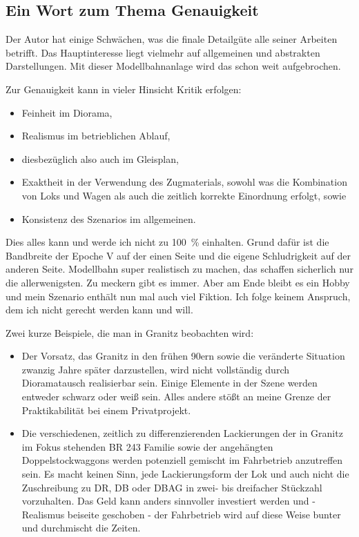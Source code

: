 \subsection{Ein Wort zum Thema Genauigkeit}
\label{sec:modelingAccuracy}

Der Autor hat einige Schw\"achen, was die finale Detailg\"ute alle seiner Arbeiten betrifft.
Das Hauptinteresse liegt vielmehr auf allgemeinen und abstrakten Darstellungen.
Mit dieser Modellbahnanlage wird das schon weit aufgebrochen.

Zur Genauigkeit kann in vieler Hinsicht Kritik erfolgen:
\begin{itemize}
	\item Feinheit im Diorama,
	\item Realismus im betrieblichen Ablauf,
	\item diesbez\"uglich also auch im Gleisplan,
	\item Exaktheit in der Verwendung des Zugmaterials, sowohl was die Kombination von Loks und Wagen als auch die zeitlich korrekte Einordnung erfolgt, sowie
	\item Konsistenz des Szenarios im allgemeinen.
\end{itemize}

Dies alles kann und werde ich nicht zu 100~\% einhalten.
Grund daf\"ur ist die Bandbreite der Epoche V auf der einen Seite und die eigene Schludrigkeit auf der anderen Seite.
Modellbahn super realistisch zu machen, das schaffen sicherlich nur die allerwenigsten.
Zu meckern gibt es immer.
Aber am Ende bleibt es ein Hobby und mein Szenario enth\"alt nun mal auch viel Fiktion.
Ich folge keinem Anspruch, dem ich nicht gerecht werden kann und will.

Zwei kurze Beispiele, die man in Granitz beobachten wird:
\begin{itemize}
	\item Der Vorsatz, das Granitz in den fr\"uhen 90ern sowie die ver\"anderte Situation zwanzig Jahre sp\"ater darzustellen, wird nicht vollst\"andig durch Dioramatausch realisierbar sein.
	Einige Elemente in der Szene werden entweder schwarz oder wei{\ss} sein.
	Alles andere st\"o{\ss}t an meine Grenze der Praktikabilit\"at bei einem Privatprojekt.
	\item Die verschiedenen, zeitlich zu differenzierenden Lackierungen der in Granitz im Fokus stehenden BR 243 Familie sowie der angeh\"angten Doppelstockwaggons werden potenziell gemischt im Fahrbetrieb anzutreffen sein.
	Es macht keinen Sinn, jede Lackierungsform der Lok und auch nicht die Zuschreibung zu DR, DB oder DBAG in zwei- bis dreifacher St\"uckzahl vorzuhalten.
	Das Geld kann anders sinnvoller investiert werden und - Realismus beiseite geschoben - der Fahrbetrieb wird auf diese Weise bunter und durchmischt die Zeiten.
\end{itemize}

 